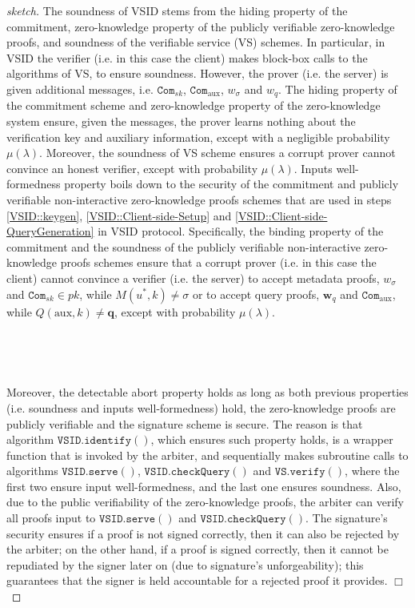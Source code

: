 
\begin{proof}[sketch] The soundness  of VSID  stems  from the hiding property of the commitment, zero-knowledge property of the publicly verifiable zero-knowledge proofs, and soundness of  the  verifiable service (VS) schemes. In particular, in VSID the verifier (i.e. in this case the client) makes block-box calls to the algorithms of   VS, to ensure soundness. However, the prover (i.e.  the server) is given  additional messages, i.e.   $\mathtt{Com}_{\scriptscriptstyle sk}$,  $\mathtt{Com}_{\scriptscriptstyle \text{aux}}$, $w_{\scriptscriptstyle\sigma}$ and $w_{\scriptscriptstyle q}$. The hiding property of the commitment scheme and zero-knowledge property of the zero-knowledge system ensure, given the messages, the prover learns nothing about the verification key and auxiliary information, except with a negligible probability $\mu(\lambda)$. Moreover, the soundness of VS scheme ensures a corrupt prover cannot convince an honest verifier, except with  probability $\mu(\lambda)$.   Inputs well-formedness property boils down to the security of the commitment and publicly verifiable non-interactive zero-knowledge proofs   schemes that are used in steps \ref{VSID::keygen}, \ref{VSID::Client-side-Setup} and \ref{VSID::Client-side-QueryGeneration} in VSID protocol. Specifically,  the binding property of the commitment and the soundness of the publicly verifiable non-interactive zero-knowledge proofs schemes  ensure that a corrupt prover (i.e. in this case the client) cannot convince a verifier (i.e. the server) to accept metadata proofs, $w_{\scriptscriptstyle\sigma}$ and $\mathtt{Com}_{\scriptscriptstyle sk}\in pk$, while  $M(u^{\scriptscriptstyle *},k)\neq \sigma $ or to accept query proofs, $\bm{w}_{\scriptscriptstyle q}$ and $\mathtt{Com}_{\scriptscriptstyle \text{aux}}$, while $Q(\text{aux},k)\neq \bm{q}$, except with  probability $\mu(\lambda)$. 

\

\

Moreover, the detectable abort property holds as long as both previous properties (i.e. soundness and inputs well-formedness) hold, the zero-knowledge proofs are publicly verifiable and the signature scheme is secure. The reason is that algorithm $\mathtt{VSID.identify}()$, which  ensures such property  holds,  is a wrapper function that is invoked by the arbiter, and  sequentially makes subroutine calls to algorithms  $\mathtt{VSID.serve}()$,  $\mathtt{VSID.checkQuery}()$ and $\mathtt{VS.verify}()$,   where the first two ensure input well-formedness, and the last one ensures soundness. Also, due to the public verifiability of the zero-knowledge proofs, the arbiter can verify all proofs input to   $\mathtt{VSID.serve}()$ and $\mathtt{VSID.checkQuery}()$. The signature's security ensures if a proof is not signed correctly, then it can also be rejected by the arbiter; on the other hand, if a proof is signed correctly, then  it cannot be repudiated by the signer later on (due to signature's unforgeability); this guarantees that the signer is held accountable for a rejected proof it provides.  \hfill\(\Box\)\end{proof}
  
  
  
  
  
  